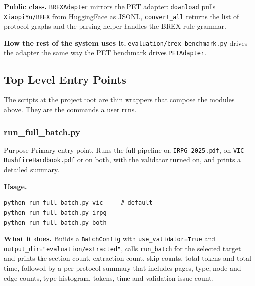 \documentclass{article}
\begin{document}
\textbf{Public class.} \texttt{BREXAdapter} mirrors the PET adapter:
\texttt{download} pulls \texttt{XiaopiYu/BREX} from HuggingFace as
JSONL, \texttt{convert\_all} returns the list of protocol graphs and
the parsing helper handles the BREX rule grammar.

\textbf{How the rest of the system uses it.}
\texttt{evaluation/brex\_benchmark.py} drives the adapter the same way
the PET benchmark drives \texttt{PETAdapter}.

\subsection{Top Level Entry Points}

The scripts at the project root are thin wrappers that compose the
modules above. They are the commands a user runs.

\subsubsection{run\_full\_batch.py}

\begin{codeconceptbox}{Purpose}
Primary entry point. Runs the full pipeline on
\texttt{IRPG-2025.pdf}, on \texttt{VIC-BushfireHandbook.pdf} or on
both, with the validator turned on, and prints a detailed summary.
\end{codeconceptbox}

\textbf{Usage.}

\begin{tcolorbox}[colback=mygray, colframe=mygray, sharp corners, boxrule=0pt]
\begin{verbatim}
python run_full_batch.py vic     # default
python run_full_batch.py irpg
python run_full_batch.py both
\end{verbatim}
\end{tcolorbox}

\textbf{What it does.} Builds a \texttt{BatchConfig} with
\texttt{use\_validator=True} and \texttt{output\_dir="evaluation/extracted"},
calls \texttt{run\_batch} for the selected target and prints the
section count, extraction count, skip counts, total tokens and total
time, followed by a per protocol summary that includes pages, type,
node and edge counts, type histogram, tokens, time and validation
issue count.

\end{document}
